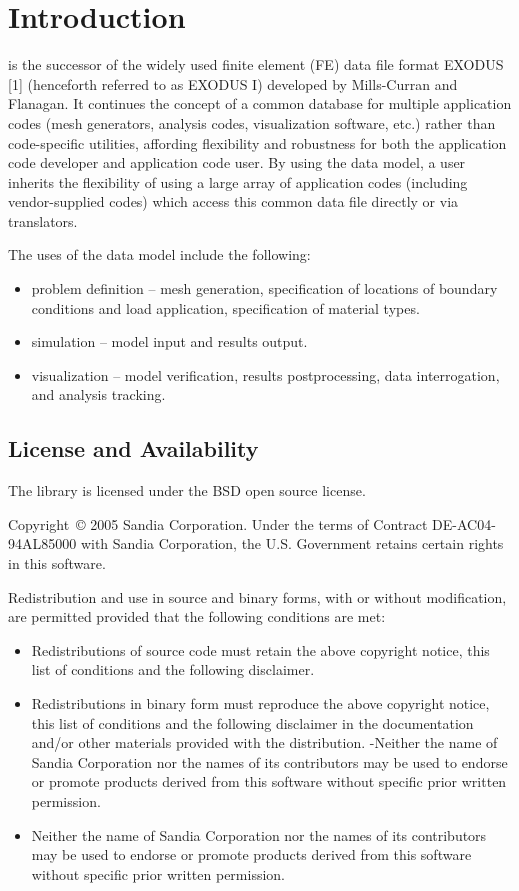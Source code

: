 \chapter{Introduction}

\exo{} is the successor of the widely used finite element 
(FE) data file format EXODUS [1] (henceforth referred to as EXODUS I)
developed by Mills-Curran and Flanagan. It continues the concept of a
common database for multiple application codes (mesh generators,
analysis codes, visualization software, etc.) rather than
code-specific utilities, affording flexibility and robustness for both
the application code developer and application code user. By using the
\exo{} data model, a user inherits the flexibility of using a large
array of application codes (including vendor-supplied codes) which
access this common data file directly or via translators.

The uses of the \exo{} data model include the following:

\begin{itemize}
 \item problem definition -- mesh generation, specification 
of locations of boundary conditions and load application, specification 
of material types.
\item simulation -- model input and results output.
\item visualization -- model verification, results postprocessing, 
data interrogation, and analysis tracking.
\end{itemize}

\section{License and Availability}
The \exo{} library is licensed under the BSD open source license.

Copyright~\copyright{} 2005 Sandia Corporation. Under the terms of
Contract DE-AC04-94AL85000 with Sandia Corporation, the
U.S. Government retains certain rights in this software.

Redistribution and use in source and binary forms, with or without
modification, are permitted provided that the following conditions are
met:
\begin{itemize}
\item Redistributions of source code must retain the above copyright notice,
this list of conditions and the following disclaimer.
\item Redistributions in binary form must reproduce the above copyright
notice, this list of conditions and the following disclaimer in the
documentation and/or other materials provided with the
distribution. -Neither the name of Sandia Corporation nor the names of
its contributors may be used to endorse or promote products derived
from this software without specific prior written permission.
\item Neither the name of Sandia Corporation nor the names of its
contributors may be used to endorse or promote products derived from
this software without specific prior written permission.
\end{itemize}

